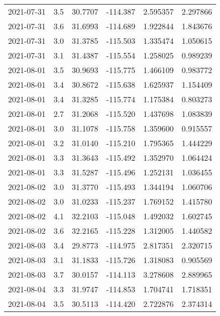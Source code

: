 \begin{tabular}{lrrrrr}
2021-07-31 &       3.5 &  30.7707 &  -114.387 &         2.595357 &         2.297866 \\
2021-07-31 &       3.6 &  31.6993 &  -114.689 &         1.922844 &         1.843676 \\
2021-07-31 &       3.0 &  31.3785 &  -115.503 &         1.335474 &         1.050615 \\
2021-07-31 &       3.1 &  31.4387 &  -115.554 &         1.258025 &         0.989239 \\
2021-08-01 &       3.5 &  30.9693 &  -115.775 &         1.466109 &         0.983772 \\
2021-08-01 &       3.4 &  30.8672 &  -115.638 &         1.625937 &         1.154409 \\
2021-08-01 &       3.4 &  31.3285 &  -115.774 &         1.175384 &         0.803273 \\
2021-08-01 &       2.7 &  31.2068 &  -115.520 &         1.437698 &         1.083839 \\
2021-08-01 &       3.0 &  31.1078 &  -115.758 &         1.359600 &         0.915557 \\
2021-08-01 &       3.2 &  31.0140 &  -115.210 &         1.795365 &         1.444229 \\
2021-08-01 &       3.3 &  31.3643 &  -115.492 &         1.352970 &         1.064424 \\
2021-08-01 &       3.3 &  31.5287 &  -115.496 &         1.252131 &         1.036455 \\
2021-08-02 &       3.0 &  31.3770 &  -115.493 &         1.344194 &         1.060706 \\
2021-08-02 &       3.0 &  31.0233 &  -115.237 &         1.769152 &         1.415780 \\
2021-08-02 &       4.1 &  32.2103 &  -115.048 &         1.492032 &         1.602745 \\
2021-08-02 &       3.6 &  32.2165 &  -115.228 &         1.312005 &         1.440582 \\
2021-08-03 &       3.4 &  29.8773 &  -114.975 &         2.817351 &         2.320715 \\
2021-08-03 &       3.1 &  31.1833 &  -115.726 &         1.318083 &         0.905569 \\
2021-08-03 &       3.7 &  30.0157 &  -114.113 &         3.278608 &         2.889965 \\
2021-08-04 &       3.3 &  31.9747 &  -114.853 &         1.704741 &         1.718351 \\
2021-08-04 &       3.5 &  30.5113 &  -114.420 &         2.722876 &         2.374314 \\

\end{tabular}
